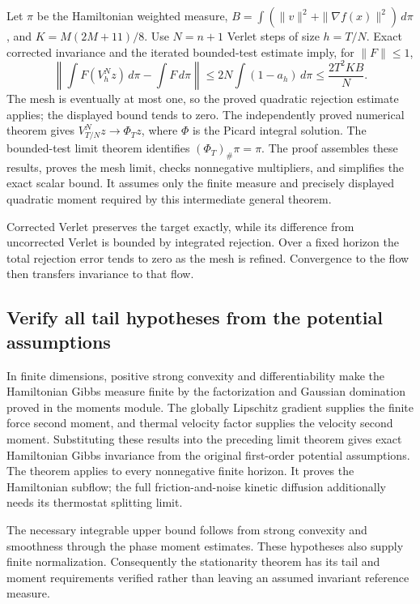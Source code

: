 \documentclass[11pt,a4paper]{report}
\begin{document}
Let \(\pi\) be the Hamiltonian weighted measure, \(B=\int(\|v\|^2+\|\nabla f(x)\|^2)\,d\pi\), and \(K=M(2M+11)/8\). Use \(N=n+1\) Verlet steps of size \(h=T/N\). Exact corrected invariance and the iterated bounded-test estimate imply, for \(\|F\|\le1\), \[\left\|\int F(V_h^Nz)\,d\pi-\int F\,d\pi\right\|\le 2N\int(1-a_h)\,d\pi\le\frac{2T^2KB}{N}.\] The mesh is eventually at most one, so the proved quadratic rejection estimate applies; the displayed bound tends to zero. The independently proved numerical theorem gives \(V_{T/N}^Nz\to\Phi_Tz\), where \(\Phi\) is the Picard integral solution. The bounded-test limit theorem identifies \((\Phi_T)_\#\pi=\pi\). The proof assembles these results, proves the mesh limit, checks nonnegative multipliers, and simplifies the exact scalar bound. It assumes only the finite measure and precisely displayed quadratic moment required by this intermediate general theorem.



Corrected Verlet preserves the target exactly, while its difference from uncorrected Verlet is bounded by integrated rejection. Over a fixed horizon the total rejection error tends to zero as the mesh is refined. Convergence to the flow then transfers invariance to that flow.

\subsection{\texorpdfstring{Verify all tail hypotheses from the potential assumptions}{Verify all tail hypotheses from the potential assumptions}}
\label{report-step-KineticLangevin-HamiltonianStationarity-lean-3}


In finite dimensions, positive strong convexity and differentiability make the Hamiltonian Gibbs measure finite by the factorization and Gaussian domination proved in the moments module. The globally Lipschitz gradient supplies the finite force second moment, and thermal velocity factor supplies the velocity second moment. Substituting these results into the preceding limit theorem gives exact Hamiltonian Gibbs invariance from the original first-order potential assumptions. The theorem applies to every nonnegative finite horizon. It proves the Hamiltonian subflow; the full friction-and-noise kinetic diffusion additionally needs its thermostat splitting limit.



The necessary integrable upper bound follows from strong convexity and smoothness through the phase moment estimates. These hypotheses also supply finite normalization. Consequently the stationarity theorem has its tail and moment requirements verified rather than leaving an assumed invariant reference measure.
\end{document}
